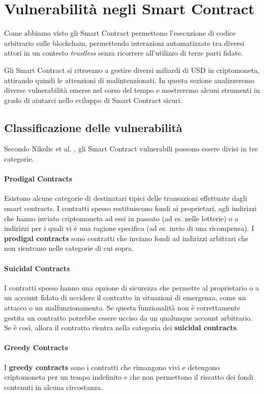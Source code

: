 \section{Vulnerabilità negli Smart Contract}
Come abbiamo visto gli Smart Contract permettono l'esecuzione di codice arbitrario
sulle blockchain, permettendo interazioni automatizzate tra diversi attori in un contesto
\textit{trustless} senza ricorrere all'utilizzo di terze parti fidate.

Gli Smart Contract si ritrovano a gestire diversi miliardi di USD in criptomoneta,
attirando quindi le attenzioni di malintenzionati. In questa sezione analizzeremo
diverse vulnerabilità emerse nel corso del tempo e mostreremo
alcuni strumenti in grado di aiutarci nello sviluppo di Smart Contract sicuri.

\subsection{Classificazione delle vulnerabilità}
Secondo Nikolic et al. \cite{Nikolic2018FindingTG},
gli Smart Contract vulnerabili possono essere divisi in tre categorie.

\paragraph{Prodigal Contracts}
Esistono alcune categorie di destinatari tipici delle transazioni effettuate
dagli smart contracts. I contratti spesso restituiscono fondi ai
proprietari, agli indirizzi che hanno inviato
criptomoneta ad essi in passato (ad es. nelle lotterie) o a indirizzi
per i quali vi è una ragione specifica (ad es. invio di una ricompensa).
I \textbf{prodigal contracts} sono contratti che inviano fondi ad
indirizzi arbitrari che non rientrano nelle categorie di cui sopra.

\paragraph{Suicidal Contracts}
I contratti spesso hanno una opzione di sicurezza che permette al proprietario
o a un account fidato di uccidere il contratto in situazioni di emergenza,
come un attacco o un malfunzionamento. Se questa funzionalità non è correttamente gestita
un contratto potrebbe essere ucciso da un qualunque account arbitrario.
Se è così, allora il contratto rientra nella categoria dei \textbf{suicidal contracts}.

\paragraph{Greedy Contracts}
I \textbf{greedy contracts} sono i contratti che rimangono vivi e detengono
criptomoneta per un tempo indefinito e che non permettono il riscatto dei
fondi contenuti in alcuna circostanza.


